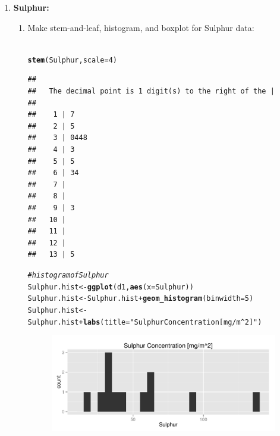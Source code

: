 \documentclass{article}\usepackage[]{graphicx}\usepackage[]{color}
\makeatletter
\def\maxwidth{ %
  \ifdim\Gin@nat@width>\linewidth
    \linewidth
  \else
    \Gin@nat@width
  \fi
}
\newcommand{\hlnum}[1]{\textcolor[rgb]{0.686,0.059,0.569}{#1}}%
\newcommand{\hlstr}[1]{\textcolor[rgb]{0.192,0.494,0.8}{#1}}%
\newcommand{\hlcom}[1]{\textcolor[rgb]{0.678,0.584,0.686}{\textit{#1}}}%
\newcommand{\hlopt}[1]{\textcolor[rgb]{0,0,0}{#1}}%
\newcommand{\hlstd}[1]{\textcolor[rgb]{0.345,0.345,0.345}{#1}}%
\newcommand{\hlkwb}[1]{\textcolor[rgb]{0.69,0.353,0.396}{#1}}%
\newcommand{\hlkwc}[1]{\textcolor[rgb]{0.333,0.667,0.333}{#1}}%
\newcommand{\hlkwd}[1]{\textcolor[rgb]{0.737,0.353,0.396}{\textbf{#1}}}%
\newenvironment{kframe}{%
 \def\at@end@of@kframe{}%
 \ifinner\ifhmode%
  \def\at@end@of@kframe{\end{minipage}}%
  \begin{minipage}{\columnwidth}%
 \fi\fi%
 \def\FrameCommand##1{\hskip\@totalleftmargin \hskip-\fboxsep
 \colorbox{shadecolor}{##1}\hskip-\fboxsep
     \hskip-\linewidth \hskip-\@totalleftmargin \hskip\columnwidth}%
 \MakeFramed {\advance\hsize-\width
   \@totalleftmargin\z@ \linewidth\hsize
   \@setminipage}}%
 {\par\unskip\endMakeFramed%
 \at@end@of@kframe}
\newenvironment{knitrout}{}{} %
\makeatother
\begin{document}
\begin{enumerate}
\begin{enumerate}
      \end{enumerate}
  \item \textbf{Sulphur:}
    \begin{enumerate}
      \item Make stem-and-leaf, histogram, and boxplot for Sulphur data: \\ \\
\begin{knitrout}
\color{fgcolor}\begin{kframe}
\begin{alltt}
\hlkwd{stem}\hlstd{(Sulphur,} \hlkwc{scale} \hlstd{=} \hlnum{4}\hlstd{)}
\end{alltt}
\begin{verbatim}
## 
##   The decimal point is 1 digit(s) to the right of the |
## 
##    1 | 7
##    2 | 5
##    3 | 0448
##    4 | 3
##    5 | 5
##    6 | 34
##    7 | 
##    8 | 
##    9 | 3
##   10 | 
##   11 | 
##   12 | 
##   13 | 5
\end{verbatim}
\end{kframe}
\end{knitrout}

\begin{knitrout}
\color{fgcolor}\begin{kframe}
\begin{alltt}
\hlcom{# histogram of Sulphur}
\hlstd{Sulphur.hist} \hlkwb{<-} \hlkwd{ggplot}\hlstd{(d1,} \hlkwd{aes}\hlstd{(}\hlkwc{x} \hlstd{= Sulphur))}
\hlstd{Sulphur.hist} \hlkwb{<-} \hlstd{Sulphur.hist} \hlopt{+} \hlkwd{geom_histogram}\hlstd{(}\hlkwc{binwidth} \hlstd{=} \hlnum{5}\hlstd{)}
\hlstd{Sulphur.hist} \hlkwb{<-} \hlstd{Sulphur.hist} \hlopt{+} \hlkwd{labs}\hlstd{(}\hlkwc{title} \hlstd{=} \hlstr{"Sulphur Concentration [mg/m^2]"}\hlstd{)}
\end{alltt}
\end{kframe}
\end{knitrout}

\begin{figure}[H]  \begin{center}
\begin{knitrout}
\color{fgcolor}
\includegraphics[width=\maxwidth]{figure/2p_hist} 


\end{knitrout}
\end{center}
\end{figure}
\end{enumerate}
\end{enumerate}
\end{document}

